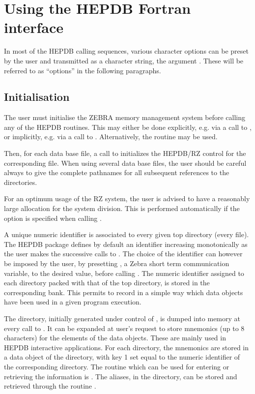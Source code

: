 
\chapter{Using the HEPDB Fortran interface}

In most of the HEPDB calling sequences, various character options can
be preset by the user and transmitted as a character string, the
argument .
These will be referred to as ``options'' in the following paragraphs.

\section{Initialisation}

The user must initialise the ZEBRA memory management
%
system before calling any of the HEPDB routines. This may
either be done explicitly, e.g. via a call to , or
implicitly, e.g. via a call to .
Alternatively, the routine  may be used.

Then, for each data base file, a call to
 initializes the HEPDB/RZ control for the corresponding file. When
using several data base files, the user should be careful always to give
the complete pathnames for all subsequent references to the directories.

For an optimum usage of the RZ system, the user is advised to have a
reasonably large allocation for the system division.
This is performed automatically if the option  is specified when calling
.

A unique numeric identifier is associated to every given top directory
(every file). The HEPDB package defines by default an identifier
increasing monotonically as the user makes the successive calls to
. The choice of the identifier can however be imposed by the user,
by presetting , a Zebra short term communication variable, to
%
the desired value, before calling . The numeric identifier
assigned to each directory packed with that of the top directory, is
stored in the corresponding  bank. This permits to record in a
simple way which data objects have been used in a given program
execution.

The  directory, initially generated under control of ,
is dumped into memory at every call to . It can be expanded at
user's request to store mnemonics (up to 8 characters) for the elements
of the data objects. These are mainly used in HEPDB interactive
applications. For each directory, the mnemonics are stored in a data
object of the  directory, with key 1 set equal to the numeric
identifier of the corresponding directory. The routine which can be
used for entering or retrieving the information is .
The aliases, in the  directory, can be
stored and retrieved through the routine .

